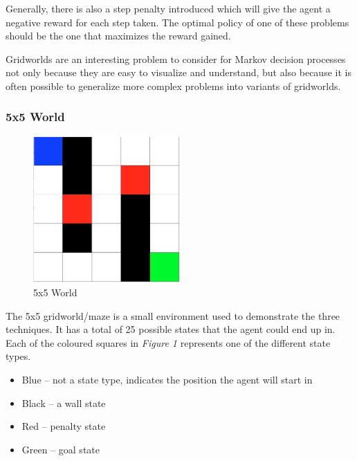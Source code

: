 \documentclass[a4paper,10pt]{article}
\begin{document}
Generally, there is also a step penalty introduced which will give the agent a negative reward for each step taken.
The optimal policy of one of these problems should be the one that maximizes the reward gained.

Gridworlds are an interesting problem to consider for Markov decision processes not only because they are easy to visualize and understand, but also because it is often possible to generalize more complex problems into variants of gridworlds.

\subsubsection{5x5 World}

\begin{figure}[htb!]
\centering
\includegraphics[width=0.5\textwidth]{figures/5by5_nopolicy.png}
\caption{5x5 World}
\end{figure}

The 5x5 gridworld/maze is a small environment used to demonstrate the three techniques. It has a total of 25 possible states that the agent could end up in. Each of the coloured squares in \textit{Figure 1} represents one of the different state types.

\begin{itemize}
\item Blue -- not a state type, indicates the position the agent will start in
\item Black -- a wall state
\item Red -- penalty state
\item Green -- goal state
\end{itemize}
\end{document}
